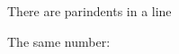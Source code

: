 \documentclass{scrartcl}
\newcounter{test}
\begin{document}
	
	There are \getlengthratio{\textwidth}{\parindent} parindents in a line
	
	\setcounter{test}{\getlengthratio{\textwidth}{\parindent}}
	
	The same number: \thetest
	
\end{document}
